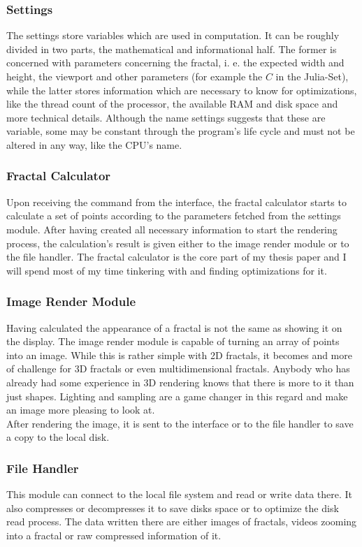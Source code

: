 \documentclass[10pt,a4paper,titlepage]{article}
\begin{document}
	\subsubsection{Settings}
	The settings store variables which are used in computation. It can be roughly divided in two parts, the mathematical and informational half. The former is concerned with parameters concerning the fractal, i. e. the expected width and height, the viewport and other parameters (for example the \(C\) in the Julia-Set), while the latter stores information which are necessary to know for optimizations, like the thread count of the processor, the available RAM and disk space and more technical details. Although the name settings suggests that these are variable, some may be constant through the program's life cycle and must not be altered in any way, like the CPU's name.
	\subsubsection{Fractal Calculator}
	Upon receiving the command from the interface, the fractal calculator starts to calculate a set of points according to the parameters fetched from the settings module. After having created all necessary information to start the rendering process, the calculation's result is given either to the image render module or to the file handler. The fractal calculator is the core part of my thesis paper and I will spend most of my time tinkering with and finding optimizations for it.
	\subsubsection{Image Render Module}
	Having calculated the appearance of a fractal is not the same as showing it on the display. The image render module is capable of turning an array of points into an image. While this is rather simple with 2D fractals, it becomes and more of challenge for 3D fractals or even multidimensional fractals. Anybody who has already had some experience in 3D rendering knows that there is more to it than just shapes. Lighting and sampling are a game changer in this regard and make an image more pleasing to look at.\\
	After rendering the image, it is sent to the interface or to the file handler to save a copy to the local disk.
	\subsubsection{File Handler}
	This module can connect to the local file system and read or write data there. It also compresses or decompresses it to save disks space or to optimize the disk read process. The data written there are either images of fractals, videos zooming into a fractal or raw compressed information of it.
\end{document}
